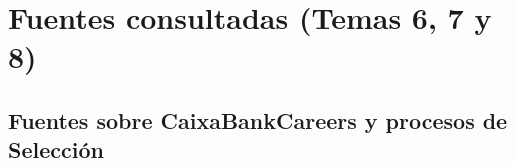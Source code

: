 %

\chapter*{Fuentes consultadas (Temas 6, 7 y 8)}

\section*{Fuentes sobre CaixaBankCareers y procesos de Selección}


